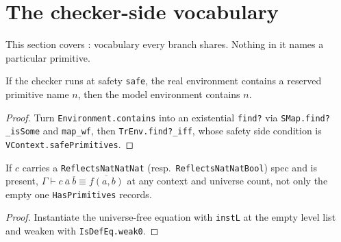 \section{The checker-side vocabulary}

This section covers : vocabulary
every branch shares. Nothing in it names a particular primitive.

\begin{lemma}
\label{vpc:thm:contains-primitive}\leanok
{}

 If the checker runs at safety \texttt{safe}, the real environment contains a
reserved primitive name $n$, then the model environment contains $n$.
\end{lemma}
\begin{proof}\leanok
{}
 Turn \texttt{Environment.contains} into an existential \texttt{find?} via
\texttt{SMap.find?\_isSome} and \texttt{map\_wf}, then \texttt{TrEnv.find?\_iff}, whose safety
side condition is \texttt{VContext.safePrimitives}.
\end{proof}

\begin{lemma}
\label{vpc:lem:natbinlit}
\leanok
{}

 If $c$ carries a \texttt{ReflectsNatNatNat} (resp.\ \texttt{ReflectsNatNatBool})
spec and is present, $\Gamma \vdash c\ \overline{a}\ \overline{b} \equiv \overline{f(a,b)}$ at any
context and universe count, not only the empty one \texttt{HasPrimitives} records.
\end{lemma}
\begin{proof}\leanok
{}
 Instantiate the universe-free equation with \texttt{instL} at the empty level list
and weaken with \texttt{IsDefEq.weak0}.
\end{proof}

